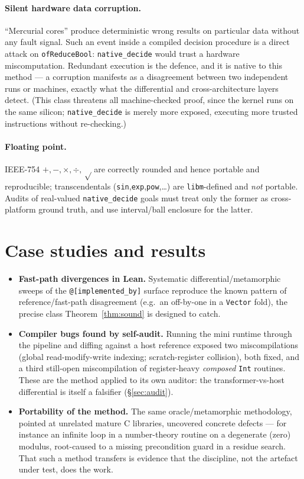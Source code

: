 \documentclass[11pt]{article}
\theoremstyle{definition}
\theoremstyle{plain}
\theoremstyle{remark}
\begin{document}
\paragraph{Silent hardware data corruption.} ``Mercurial cores'' produce deterministic wrong results on
particular data without any fault signal. Such an event inside a compiled decision procedure is a direct
attack on \texttt{ofReduceBool}: \texttt{native\_decide} would trust a hardware miscomputation.
Redundant execution is the defence, and it is native to this method --- a corruption manifests as a
disagreement between two independent runs or machines, exactly what the differential and
cross-architecture layers detect. (This class threatens all machine-checked proof, since the kernel runs
on the same silicon; \texttt{native\_decide} is merely more exposed, executing more trusted instructions
without re-checking.)

\paragraph{Floating point.} IEEE-754 $+,-,\times,\div,\sqrt$ are correctly rounded and hence portable and
reproducible; transcendentals (\texttt{sin},\texttt{exp},\texttt{pow},\dots) are \texttt{libm}-defined
and \emph{not} portable. Audits of real-valued \texttt{native\_decide} goals must treat only the former
as cross-platform ground truth, and use interval/ball enclosure for the latter.

\section{Case studies and results}\label{sec:results}

\begin{itemize}[leftmargin=1.2em,itemsep=2pt]
\item \textbf{Fast-path divergences in Lean.} Systematic differential/metamorphic sweeps of the
      \texttt{@[implemented\_by]} surface reproduce the known pattern of reference/fast-path
      disagreement (e.g.\ an off-by-one in a \texttt{Vector} fold), the precise class
      Theorem~\ref{thm:sound} is designed to catch.
\item \textbf{Compiler bugs found by self-audit.} Running the mini runtime through the pipeline and
      diffing against a host reference exposed two miscompilations (global read-modify-write indexing;
      scratch-register collision), both fixed, and a third still-open miscompilation of register-heavy
      \emph{composed} \texttt{Int} routines. These are the method applied to its own auditor: the
      transformer-vs-host differential is itself a falsifier (\S\ref{sec:audit}).
\item \textbf{Portability of the method.} The same oracle/metamorphic methodology, pointed at unrelated
      mature C libraries, uncovered concrete defects --- for instance an infinite loop in a
      number-theory routine on a degenerate (zero) modulus, root-caused to a missing precondition guard
      in a residue search. That such a method transfers is evidence that the discipline, not the
      artefact under test, does the work.
\end{itemize}
\end{document}
